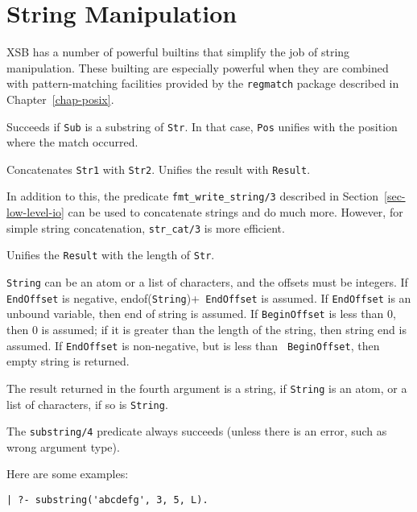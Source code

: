\section{String Manipulation}
\label{sec-strings}

XSB has a number of powerful builtins that simplify the job of string
manipulation. These builting are especially powerful when they are combined
with pattern-matching facilities provided by the {\tt regmatch} package
described in Chapter~\ref{chap-posix}.

\begin{description}

Succeeds if {\tt Sub} is a substring of {\tt Str}. In that case, {\tt Pos}
unifies with the position where the match occurred.


Concatenates {\tt Str1} with {\tt Str2}. Unifies the result with {\tt Result}.

In addition to this, the predicate \verb|fmt_write_string/3| described in
Section~\ref{sec-low-level-io} can be used to concatenate strings and do
much more. However, for simple string concatenation, {\tt str\_cat/3} is
more efficient.


Unifies the {\tt Result}  with the length of {\tt Str}.

{\tt String} can be an atom or a list of characters, and the offsets must
be integers.  If {\tt EndOffset} is negative, endof({\tt String})+{\tt
  EndOffset} is assumed. If {\tt EndOffset} is an unbound variable, then
end of string is assumed. If {\tt BeginOffset} is less than 0, then 0 is
assumed; if it is greater than the length of the string, then string end is
assumed. If {\tt EndOffset} is non-negative, but is less than {\tt
  BeginOffset}, then empty string is returned.

The result returned in the fourth argument is a string, if {\tt String} is
an atom, or a list of characters, if so is {\tt String}.

The \verb|substring/4| predicate always succeeds (unless there is an error,
such as wrong argument type).

Here are some examples: 
\begin{verbatim}
| ?- substring('abcdefg', 3, 5, L).


\end{verbatim}
\end{description}
